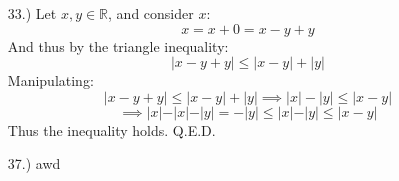 \documentclass[12pt]{article}
\newcommand{\contradiction}{
    \ensuremath{{\Rightarrow\mspace{-2mu}\Leftarrow}}
}
\newcommand{\vertb}[1]{\left\vert#1\right\vert}
\begin{document}
\pagestyle{fancy}
\fancyhead{}

\normalsize
\begin{itemize}




    \item [33.)] Let $x,y\in\mathbb{R}$, and consider $x$:
        \[x=x+0=x-y+y\]
        And thus by the triangle inequality:
        \[\vertb{x-y+y}\leq\vertb{x-y}+\vertb{y}\]
        Manipulating:
        \[\vert
        x-y+y\vert\leq\vertb{x-y}+\vertb{y}\implies\vertb{x}-\vertb{y}\leq\vertb{x-y}\]
        \[\implies\vert x\vert-\vert x\vert-\vert y\vert=-\vert y\vert\leq\vert x\vert-\vert y\vert\leq\vert x-y\vert\]
        Thus the inequality holds. Q.E.D.

    \item [37.)] awd



\end{itemize}
\end{document}
